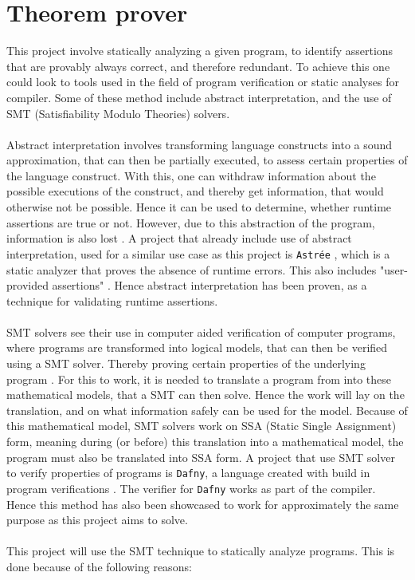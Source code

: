 
\section{Theorem prover \rr} \label{sec:z3}
This project involve statically analyzing a given program, to identify assertions that are
provably always correct, and therefore redundant. To achieve this one could look to tools used in
the field of program verification or static analyses for compiler.
Some of these method include abstract interpretation, and the use of SMT
(Satisfiability Modulo Theories) solvers.
\\
\\
Abstract interpretation involves transforming language constructs into a sound approximation,
that can then be partially executed, to assess certain properties of the language construct.
With this, one can withdraw information about the possible executions of the construct, and
thereby get information, that would otherwise not be possible. Hence it can be used to determine,
whether runtime assertions are true or not. However, due to this abstraction of the program,
information is also lost \cite{ai}. A project that already include use of abstract interpretation,
used for a similar use case as this project is \texttt{Astrée} \cite{astree}, which is a static
analyzer that proves the absence of runtime errors. This also includes "user-provided assertions"
\cite{astree}. Hence abstract interpretation has been proven, as a technique for validating
runtime assertions.
\\
\\
SMT solvers see their use in computer aided verification of computer programs, where programs
are transformed into logical models, that can then be verified using a SMT solver. Thereby proving
certain properties of the underlying program \cite{sigda}. For this to work, it is needed to
translate a program from \lan into these mathematical models, that a SMT can then solve. Hence
the work will lay on the translation, and on what information safely can be used for the model.
Because of this mathematical model, SMT solvers work on SSA (Static Single Assignment) form,
meaning during (or before) this translation into a mathematical model, the \lan program must also
be translated into SSA form. A project that use SMT solver to verify properties of programs is
\texttt{Dafny}, a language created with build in program verifications \cite{dafny}. The verifier
for \texttt{Dafny} works as part of the compiler. Hence this method has also been showcased to work
for approximately the same purpose as this project aims to solve.
\\
\\
This project will use the SMT technique to statically analyze \lan programs. This is done because
of the following reasons:

